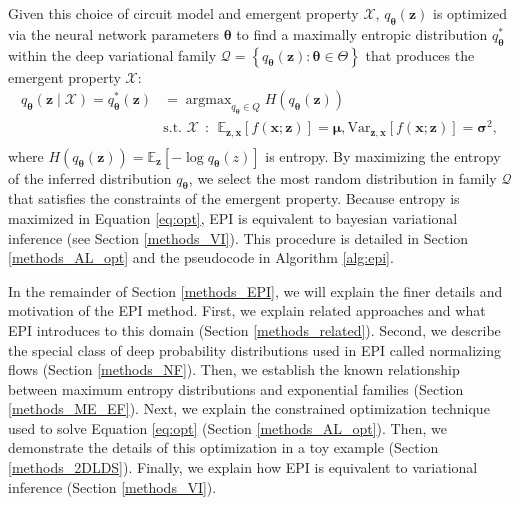 \documentclass[11pt]{article}
\DeclareMathOperator*{\argmax}{argmax}
\begin{document}
Given this choice of circuit model and emergent property $\mathcal{X}$, $q_{\bm{\theta}}(\mathbf{z})$ is optimized via the neural network parameters $\bm{\theta}$ to find a maximally entropic distribution $q_{\bm{\theta}}^*$ within the deep variational family $\mathcal{Q} = \left\{ q_{\bm{\theta}}(\mathbf{z}) : \bm{\theta} \in \Theta \right\}$ that produces the emergent property $\mathcal{X}$:
\begin{equation} \label{eq:opt}
\begin{split}
q_{\bm{\theta}}(\mathbf{z} \mid \mathcal{X}) = q_{\bm{\theta}}^*(\mathbf{z}) &= \argmax_{q_{\bm{\theta}} \in Q} H(q_{\bm{\theta}}(\mathbf{z})) \\
 &  \text{s.t.  } \mathcal{X} ~~:~~ \mathbb{E}_{\mathbf{z},\mathbf{x}}\left[f(\mathbf{x}; \mathbf{z})\right] = \bm{\mu}, \text{Var}_{\mathbf{z},\mathbf{x}}\left[f(\mathbf{x}; \mathbf{z})\right] = \bm{\sigma}^2, \\
 \end{split}
\end{equation} 
where $H(q_{\bm{\theta}}(\mathbf{z})) = \mathbb{E}_{\mathbf{z}}\left[- \log q_{\bm{\theta}}(z) \right]$ is entropy.
By maximizing the entropy of the inferred distribution $q_{\bm{\theta}}$, we select the most random distribution in family $\mathcal{Q}$ that satisfies the constraints of the emergent property.
Because entropy is maximized in Equation \ref{eq:opt}, EPI is equivalent to bayesian variational inference (see Section \ref{methods_VI}).
This procedure is detailed in Section \ref{methods_AL_opt} and the pseudocode in Algorithm \ref{alg:epi}.

In the remainder of Section \ref{methods_EPI}, we will explain the finer details and motivation of the EPI method. 
First, we explain related approaches and what EPI introduces to this domain (Section \ref{methods_related}).
Second, we describe the special class of deep probability distributions used in EPI called normalizing flows (Section \ref{methods_NF}).
Then, we establish the known relationship between maximum entropy distributions and exponential families (Section \ref{methods_ME_EF}).
Next, we explain the constrained optimization technique used to solve Equation \ref{eq:opt} (Section \ref{methods_AL_opt}).
Then, we demonstrate the details of this optimization in a toy example (Section \ref{methods_2DLDS}).
Finally, we explain how EPI is equivalent to variational inference (Section \ref{methods_VI}).
\end{document}
